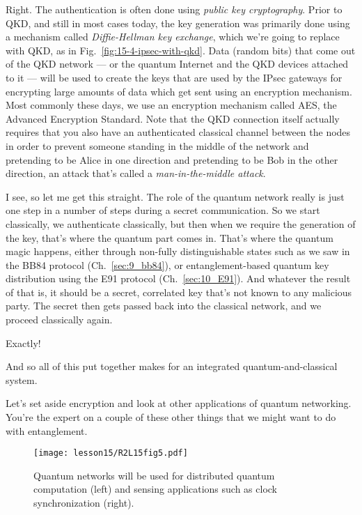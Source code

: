 
\rrr Right. The authentication is often done using \emph{public key cryptography}. Prior to QKD, and still in most cases today, the key generation was primarily done using a mechanism called \emph{Diffie-Hellman key exchange}, which we're going to replace with QKD, as in Fig.~\ref{fig:15-4-ipsec-with-qkd}. Data (random bits) that come out of the QKD network --- or the quantum Internet and the QKD devices attached to it --- will be used to create the keys that are used by the IPsec gateways for encrypting large amounts of data which get sent using an encryption mechanism. Most commonly these days, we use an encryption mechanism called AES, the Advanced Encryption Standard. Note  that the QKD connection itself actually requires that you also have an authenticated classical channel between the nodes in order to prevent someone standing in the middle of the network and pretending to be Alice in one direction and pretending to be Bob in the other direction, an attack that's called a \emph{man-in-the-middle attack}.

\mmm I see, so let me get this straight. The role of the quantum network really is just one step in a number of steps during a secret communication. So we start classically, we authenticate classically, but then when we require the generation of the key, that's where the quantum part comes in. That's where the quantum magic happens, either through non-fully distinguishable states such as we saw in the BB84 protocol (Ch.~\ref{sec:9_bb84}), or entanglement-based quantum key distribution using the E91 protocol (Ch.~\ref{sec:10_E91}). And whatever the result of that is, it should be a secret, correlated key that's not known to any malicious party.  The secret then gets passed back into the classical network, and we proceed classically again.

\rrr Exactly!

And so all of this put together makes for an integrated quantum-and-classical system.

Let's set aside encryption and look at other applications of quantum networking. You're the expert on a couple of these other things that we might want to do with entanglement.

\begin{figure}[t]
    \centering
    \texttt{[image: lesson15/R2L15fig5.pdf]}
    \caption[Uses of quantum networking]{Quantum networks will be used for distributed quantum computation (left) and sensing applications such as clock synchronization (right).}
    \label{fig:15-5-apps}
\end{figure}


